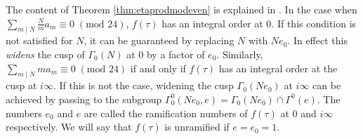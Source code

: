 \documentclass[11pt,a4paper]{amsart}
\theoremstyle{definition}
\begin{document}
The content of Theorem \ref{thm:etaprodmodeven} is explained in \cite[Section 1]{gordon1989multiplicative}. 
In the case when $\sum_{m \mid N} \frac{N}{m}a_m \equiv 0 \;(\textrm{mod }24)$, $f(\tau)$ has an integral order at 0. If this condition is not satisfied for $N$, it can be guaranteed by replacing $N$ with $Ne_0$. In effect this \emph{widens} the cusp of $\Gamma_0(N)$ at 0 by a factor of $e_0$. Similarly,  $\sum_{m \mid N} ma_m \equiv 0 \;(\textrm{mod }24)$ if and only if $f(\tau)$ has an integral order at the cusp at $i\infty$. If this is not the case, widening the cusp $\Gamma_0(Ne_0)$ at $i\infty$ can be achieved by passing to the subgroup $\Gamma_0^0(Ne_0,e)=\Gamma_0(Ne_0) \cap \Gamma^0(e)$. The numbers $e_0$ and $e$ are called the ramification numbers of $f(\tau)$ at $0$ and $i\infty$ respectively. We will say that $f(\tau)$ is unramified if $e=e_0=1$.
\end{document}
